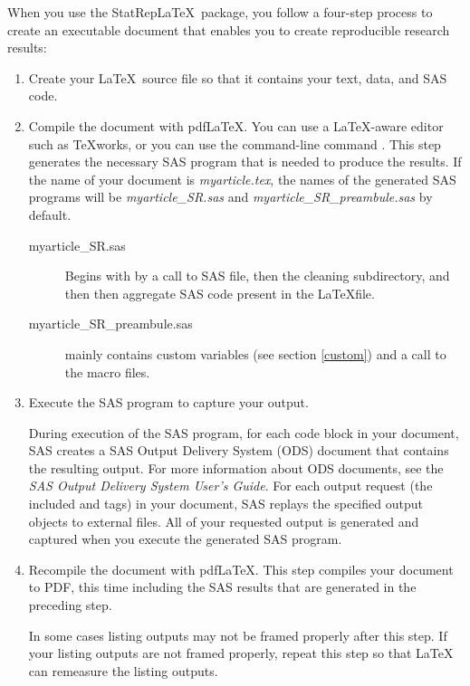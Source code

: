 \documentclass[article,oneside]{memoir}
\newcommand*{\StatRep}{\textsf{StatRep}\xspace}
\begin{document}
When you use the \StatRep \LaTeX\ package, you follow a four-step process to
create an executable document that enables you to create
reproducible research results:
\begin{enumerate}
\item Create your \LaTeX\ source file so that it contains your text, data, and SAS code.

\item Compile the document with pdf\LaTeX. You can use a LaTeX-aware
editor such as \TeX works, or you can use the command-line command .
This step generates the necessary SAS program that is needed to produce the results.
If the name of your document is \textit{myarticle.tex}, the names of the generated SAS
programs will be  \textit{myarticle\_SR.sas} and   \textit{myarticle\_SR\_preambule.sas}  by default.
\begin{description}
	\item[myarticle\_SR.sas] Begins with by a  call to   SAS file,  then the cleaning subdirectory, and then then aggregate SAS code present in the \LaTeX file.
	\item[myarticle\_SR\_preambule.sas] mainly contains custom variables (see section \ref{custom}) and a call to the  macro files.
\end{description}

\item Execute the SAS program to capture your output.

During execution of the SAS program, for each code block in your document,
SAS creates a SAS Output Delivery System (ODS) document that contains the resulting output.
For more information about ODS documents, see the
\textit{SAS Output Delivery System User's Guide}.
For each output request (the included  and  tags) in your document, SAS replays the specified output objects
to external files. All of your requested output is generated and captured when you
execute the generated SAS program.

\item Recompile the document with pdfLaTeX. This step compiles your
      document to PDF, this time including the SAS results
      that are generated in the preceding step.

      In some cases listing outputs may not be framed properly after this step.
      If your listing outputs are not framed properly, repeat this step so that
      LaTeX can remeasure the listing outputs.

\end{enumerate}
\end{document}
